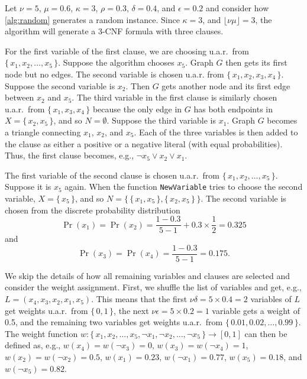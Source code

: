 \begin{example}\label{example:algorithm}
  Let $\nu = 5$, $\mu = 0.6$, $\kappa = 3$, $\rho = 0.3$, $\delta = 0.4$,
  and $\epsilon = 0.2$ and consider how \cref{alg:random} generates a random
  instance. Since $\kappa = 3$, and $\lfloor\nu\mu\rfloor = 3$,
  the algorithm will generate a 3-CNF formula with three clauses.

  For the first variable of the first clause, we are choosing u.a.r.\ from $\{\,
  x_1, x_2, \dots, x_5 \,\}$. Suppose the algorithm chooses $x_5$. Graph $G$
  then gets its first node but no edges. The second variable is chosen u.a.r.
  from $\{\, x_1, x_2, x_3, x_4 \,\}$. Suppose the second variable is $x_2$.
  Then $G$ gets another node and its first edge between $x_2$ and $x_5$. The
  third variable in the first clause is similarly chosen u.a.r.\ from $\{\, x_1,
  x_3, x_4 \,\}$ because the only edge in $G$ has both endpoints in $X = \{\,
  x_2, x_5 \,\}$, and so $N = \emptyset$. Suppose the third variable is $x_1$.
  Graph $G$ becomes a triangle connecting $x_1$, $x_2$, and $x_5$. Each of
  the three variables is then added to the clause as either a positive or a
  negative literal (with equal probabilities). Thus, the first clause becomes,
  e.g., $\neg x_5 \lor x_2 \lor x_1$.

  The first variable of the second clause is chosen u.a.r.\ from $\{\, x_1, x_2,
  \dots, x_5\,\}$. Suppose it is $x_5$ again. When the function
  \texttt{NewVariable} tries to choose the second variable, $X = \{\, x_5 \,\}$,
  and so $N = \{\, \{\, x_1, x_5 \,\}, \{\, x_2, x_5 \,\}\,\}$. The second
  variable is chosen from the discrete probability distribution
  \[
    \Pr(x_1) = \Pr(x_2) = \frac{1 - 0.3}{5 - 1} + 0.3 \times \frac{1}{2} = 0.325
  \]
  and
  \[
    \Pr(x_3) = \Pr(x_4) = \frac{1 - 0.3}{5 - 1} = 0.175.
  \]

  We skip the details of how all remaining variables and clauses are selected
  and consider the weight assignment. First, we shuffle the list of variables
  and get, e.g., $L = (x_4, x_3, x_2, x_1, x_5)$. This means that the first
  $\nu\delta = 5 \times 0.4 = 2$ variables of $L$ get weights u.a.r.\ from $\{\,
  0, 1 \,\}$, the next $\nu\epsilon = 5 \times 0.2 = 1$ variable gets a weight
  of 0.5, and the remaining two variables get weights u.a.r.\ from $\{\,0.01,
  0.02, \dots, 0.99 \,\}$. The weight function $w\colon \{\, x_1, x_2, \dots,
  x_5, \neg x_1, \neg x_2, \dots, \neg x_5\,\} \to [0, 1]$ can then be defined
  as, e.g., $w(x_4) = w(\neg x_3) = 0$, $w(x_3) = w(\neg x_4) = 1$, $w(x_2) =
  w(\neg x_2) = 0.5$, $w(x_1) = 0.23$, $w(\neg x_1) = 0.77$, $w(x_5) = 0.18$,
  and $w(\neg x_5) = 0.82$.
\end{example}

